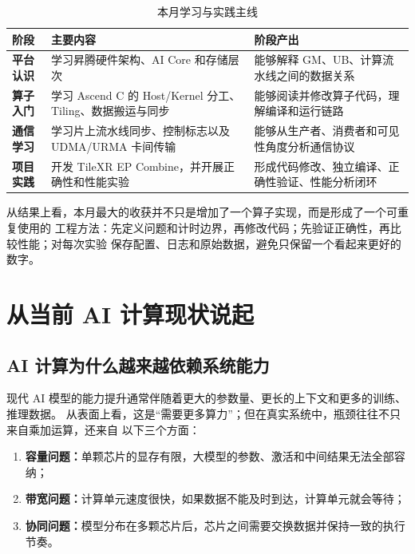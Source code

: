 \documentclass[UTF8,a4paper,11pt]{ctexart}
\newcommand{\term}[1]{\textbf{#1}}
\begin{document}
\begin{table}[htbp]
  \centering
  \caption{本月学习与实践主线}
  \label{tab:overview}
  \begin{tabularx}{\textwidth}{>{\bfseries}p{}X X}
    \toprule
    阶段 & 主要内容 & 阶段产出 \\
    \midrule
    平台认识 & 学习昇腾硬件架构、AI Core 和存储层次 & 能够解释 GM、UB、计算流水线之间的数据关系 \\
    算子入门 & 学习 Ascend C 的 Host/Kernel 分工、Tiling、数据搬运与同步 & 能够阅读并修改算子代码，理解编译和运行链路 \\
    通信学习 & 学习片上流水线同步、控制标志以及 UDMA/URMA 卡间传输 & 能够从生产者、消费者和可见性角度分析通信协议 \\
    项目实践 & 开发 TileXR EP Combine，并开展正确性和性能实验 & 形成代码修改、独立编译、正确性验证、性能分析闭环 \\
    \bottomrule
  \end{tabularx}
\end{table}

从结果上看，本月最大的收获并不只是增加了一个算子实现，而是形成了一个可重复使用的
工程方法：先定义问题和计时边界，再修改代码；先验证正确性，再比较性能；对每次实验
保存配置、日志和原始数据，避免只保留一个看起来更好的数字。

\section{从当前 AI 计算现状说起}

\subsection{AI 计算为什么越来越依赖系统能力}

现代 AI 模型的能力提升通常伴随着更大的参数量、更长的上下文和更多的训练、推理数据。
从表面上看，这是“需要更多算力”；但在真实系统中，瓶颈往往不只来自乘加运算，还来自
以下三个方面：

\begin{enumerate}
  \item \term{容量问题：}单颗芯片的显存有限，大模型的参数、激活和中间结果无法全部容纳；
  \item \term{带宽问题：}计算单元速度很快，如果数据不能及时到达，计算单元就会等待；
  \item \term{协同问题：}模型分布在多颗芯片后，芯片之间需要交换数据并保持一致的执行节奏。
\end{enumerate}
\end{document}
